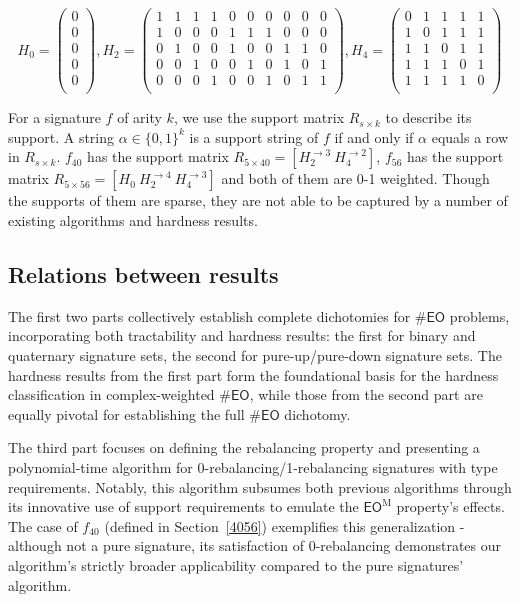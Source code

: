 \documentclass[a4paper,UKenglish,cleveref, autoref, thm-restate]{lipics-v2021}
\newcommand{\eo}[0]{\textsf{EO}}
\newcommand{\eom}[1][\text{M}]{\textsf{EO}^{#1}}
\newcommand{\ba}[1][0]{{{#1}-rebalancing}}
\begin{document}
$$H_0=\begin{pmatrix}
    0\\
     0\\
      0\\
       0\\
        0\\
\end{pmatrix}, 
H_2=\begin{pmatrix}
    1&1&1&1&0&0&0&0&0&0\\
    1&0&0&0&1&1&1&0&0&0\\
    0&1&0&0&1&0&0&1&1&0\\
    0&0&1&0&0&1&0&1&0&1\\
    0&0&0&1&0&0&1&0&1&1\\
\end{pmatrix},
H_4=\begin{pmatrix}
    0&1&1&1&1\\
    1&0&1&1&1\\
    1&1&0&1&1\\
    1&1&1&0&1\\
    1&1&1&1&0\\
\end{pmatrix}$$

For a signature $f$ of arity $k$, we use the support matrix $R_{s\times k}$ to describe its support. A string $\alpha\in \{0,1\}^k$ is a support string of $f$ if and only if $\alpha$ equals a row in $R_{s\times k}$. $f_{40}$ has the support matrix $R_{5\times40}=[H_2^{\to 3}\  H_4^{\to 2}]$, 
$f_{56}$ has the support matrix $R_{5\times56}=[H_0\ H_2^{\to 4}\ H_4^{\to 3}]$ and both of them are 0-1 weighted. Though the supports of them are sparse, they are not able to be captured by a number of existing algorithms and hardness results.


\subsection{Relations between results}\label{relations}

The first two parts collectively establish complete dichotomies for $\#\eo$ problems, incorporating both tractability and hardness results: the first for binary and quaternary signature sets, the second for pure-up/pure-down signature sets. The hardness results from the first part form the foundational basis for the hardness classification in complex-weighted $\#\eo$, while those from the second part are equally pivotal for establishing the full $\#\eo$ dichotomy.

The third part focuses on defining the rebalancing property and presenting a polynomial-time algorithm for 0-rebalancing/1-rebalancing signatures with type requirements. Notably, this algorithm subsumes both previous algorithms through its innovative use of support requirements to emulate the $\eom$ property's effects. The case of $f_{40}$ (defined in Section~\ref{4056}) exemplifies this generalization - although not a pure signature, its satisfaction of \ba[0] demonstrates our algorithm's strictly broader applicability compared to the pure signatures' algorithm.
\end{document}

